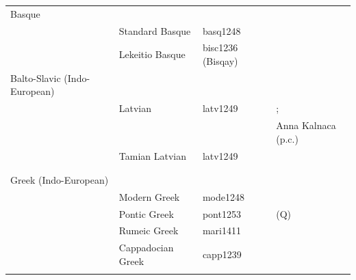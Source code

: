 \documentclass[output=collectionpaper]{langsci/langscibook}
\begin{document}
\begin{table}[htp!]
\begin{tabular}{llll}
\midrule
Basque && & \\
&Standard Basque&basq1248 & \citet{Hualde2003}\\
&Lekeitio Basque&bisc1236 (Bisqay) & \citet{Hualde1994}\\
\midrule
Balto-Slavic (Indo-European) &&&\\
& Latvian&latv1249 & \citet{Balode2001};\\
&&& Anna Kalnaca (p.c.)\\
& Tamian Latvian&latv1249&\citet{Balode2001} \\
&&&\citet{Koptjevskaja-Tamm2001}\\
&&& \citet{Thomason2015}\\
\midrule
Greek (Indo-European) &&&\\
&Modern Greek&mode1248 & \citet{Karatsareas2009,Karatsareas2014} \\
&Pontic Greek & pont1253 & \citet{Karatsareas2009,Karatsareas2014} (Q)\\
&Rumeic Greek &mari1411 & \citet{Karatsareas2009,Karatsareas2014} \\
&Cappadocian Greek& capp1239 & \citet{Karatsareas2009,Karatsareas2014} \\
 \lspbottomrule
 \end{tabular}
 \end{table}
\end{document}
